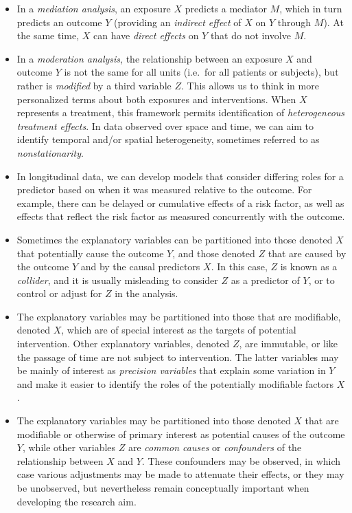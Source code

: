 \begin{itemize}

\item In a {\em mediation analysis}, an exposure $X$ predicts a mediator $M$, which in turn predicts an outcome $Y$ (providing an {\em indirect effect} of $X$ on $Y$ through $M$).  At the same time, $X$ can have {\em direct effects} on $Y$ that do not involve $M$.

\item In a {\em moderation analysis}, the relationship between an exposure $X$ and outcome $Y$ is not the same for all units (i.e.\ for all patients or subjects), but rather is {\em modified} by a third variable $Z$.  This allows us to think in more personalized terms about both exposures and interventions.  When $X$ represents a treatment, this framework permits identification of {\em heterogeneous treatment effects}.  In data observed over space and time, we can aim to identify temporal and/or spatial heterogeneity, sometimes referred to as {\em nonstationarity}.

\item In longitudinal data, we can develop models that consider differing roles for a predictor based on when it was measured relative to the outcome.  For example, there can be delayed or cumulative effects of a risk factor, as well as effects that reflect the risk factor as measured concurrently with the outcome.

\item Sometimes the explanatory variables can be partitioned into those denoted $X$ that potentially cause the outcome $Y$, and those denoted $Z$ that are caused by the outcome $Y$ and by the causal predictors $X$.  In this case, $Z$ is known as a {\em collider}, and it is usually misleading to consider $Z$ as a predictor of $Y$, or to control or adjust for $Z$ in the analysis.

\item The explanatory variables may be partitioned into those that are modifiable, denoted $X$, which are of special interest as the targets of potential intervention.  Other explanatory variables, denoted $Z$, are immutable, or like the passage of time are not subject to intervention.  The latter variables may be mainly of interest as {\em precision variables} that explain some variation in $Y$ and make it easier to identify the roles of the potentially modifiable factors $X$.

\item The explanatory variables may be partitioned into those denoted $X$ that are modifiable or otherwise of primary interest as potential causes of the outcome $Y$, while other variables $Z$ are {\em common causes} or {\em confounders} of the relationship between $X$ and $Y$.  These confounders may be observed, in which case various adjustments may be made to attenuate their effects, or they may be unobserved, but nevertheless remain conceptually important when developing the research aim.

\end{itemize}

